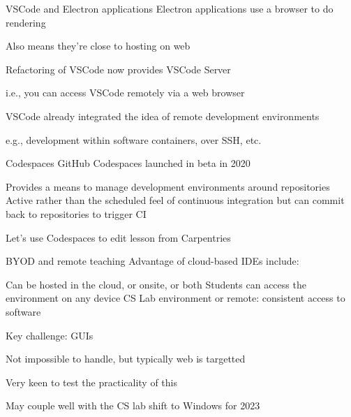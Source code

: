 \documentclass[aspectratio=169,t]{beamer}
\begin{document}
\begin{dframe}{VSCode and Electron applications}
  \1 Electron applications use a browser to do rendering
  
  \2 Also means they're close to hosting on web

  \bigskip

  \1 Refactoring of VSCode now provides VSCode Server
  
  \2 i.e., you can access VSCode remotely via a web browser
  
  \bigskip

  \1 VSCode already integrated the idea of remote development environments

  \2 e.g., development within software containers, over SSH, etc.
\end{dframe}

\begin{dframe}{Codespaces}
  \1 GitHub Codespaces launched in beta in 2020 %

  \2 Provides a means to manage development environments around repositories
  \2 Active rather than the scheduled feel of continuous integration
  \2 but can commit back to repositories to trigger CI

  \bigskip

  \1 Let's use Codespaces to edit lesson from Carpentries
\end{dframe}

\begin{dframe}{BYOD and remote teaching}
  \1 Advantage of cloud-based IDEs include:
  
  \2 Can be hosted in the cloud, or onsite, or both
  \2 Students can access the environment on any device
  \2 CS Lab environment or remote: consistent access to software

  \1 Key challenge: GUIs
  
  \2 Not impossible to handle, but typically web is targetted

  \1 Very keen to test the practicality of this
  
  \2 May couple well with the CS lab shift to Windows for 2023
\end{dframe}
\end{document}
